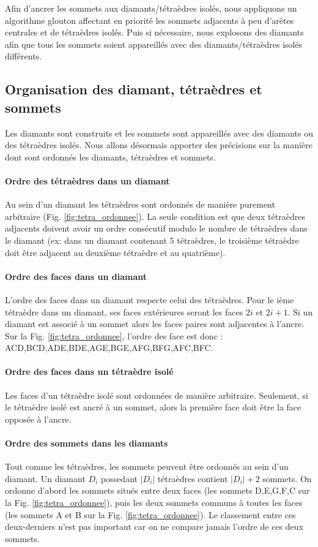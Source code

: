 \noindent
Afin d'ancrer les sommets aux diamants/tétraèdres isolés, nous appliquons un algorithme glouton affectant en priorité les sommets adjacents à peu d'arêtes centrales et de tétraèdres isolés. Puis si nécessaire, nous explosons des diamants afin que tous les sommets soient appareillés avec des diamants/tétraèdres isolés différents.

\subsection{Organisation des diamant, tétraèdres et sommets}
\noindent
Les diamants sont construits et les sommets sont appareillés avec des diamants ou des tétraèdres isolés. Nous allons désormais apporter des précisions sur la manière dont sont ordonnés les diamants, tétraèdres et sommets.
\paragraph{Ordre des tétraèdres dans un diamant}
Au sein d'un diamant les tétraèdres sont ordonnés de manière purement arbitraire (Fig. \ref{fig:tetra_ordonnee}). La seule condition est que deux tétraèdres adjacents doivent avoir un ordre consécutif modulo le nombre de tétraèdres dans le diamant (ex: dans un diamant contenant 5 tétraèdres, le troisième tétraèdre doit être adjacent au deuxième tétraèdre et au quatrième).
\paragraph{Ordre des faces dans un diamant}
L'ordre des faces dans un diamant respecte celui des tétraèdres. Pour le ième tétraèdre dans un diamant, ses faces extérieures seront les faces $2i$ et $2i+1$. Si un diamant est associé à un sommet alors les faces paires sont adjacentes à l'ancre. Sur la Fig. \ref{fig:tetra_ordonnee}, l'ordre des face est donc : ACD,BCD,ADE,BDE,AGE,BGE,AFG,BFG,AFC,BFC.
\paragraph{Ordre des faces dans un tétraèdre isolé}
Les faces d'un tétraèdre isolé sont ordonnées de manière arbitraire. Seulement, si le tétraèdre isolé est ancré à un sommet, alors la première face doit être la face opposée à l'ancre.
\paragraph{Ordre des sommets dans les diamants}
\label{Ordre des sommets dans les diamants}Tout comme les tétraèdres, les sommets peuvent être ordonnés au sein d'un diamant. Un diamant $D_i$ possedant $|D_i|$ tétraèdres contient $|D_i|+2$ sommets. On ordonne d'abord les sommets situés entre deux faces (les sommets D,E,G,F,C sur la Fig. \ref{fig:tetra_ordonnee}), puis les deux sommets communs à toutes les faces (les sommets A et B sur la Fig. \ref{fig:tetra_ordonnee}). Le classement entre ces deux-derniers n'est pas important car on ne compare jamais l'ordre de ces deux sommets.
